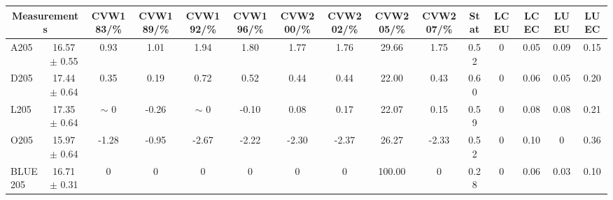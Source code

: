 \begin{table}[H]
\scriptsize
\begin{center}
\renewcommand{\arraystretch}{1.1}
\begin{tabular}{|lc|c|c|c|c|c|c|c|c|ccccc|}
\hline
\multicolumn{2}{|c|}{Measurements} & CVW{\tiny 183}/\%  & CVW{\tiny 189}/\%  & CVW{\tiny 192}/\%  & CVW{\tiny 196}/\%  & CVW{\tiny 200}/\%  & CVW{\tiny 202}/\%  & CVW{\tiny 205}/\%  & CVW{\tiny 207}/\%  & {\tiny Stat} & {\tiny LCEU} & {\tiny LCEC} & {\tiny LUEU} & {\tiny LUEC}\\
\hline
A205 &      16.57 $\pm$       0.55 &       0.93 &       1.01 &       1.94 &       1.80 &       1.77 &       1.76 &      29.66 &       1.75 &       0.52 &  0 &       0.05 &       0.09 &       0.15\\
D205 &      17.44 $\pm$       0.64 &       0.35 &       0.19 &       0.72 &       0.52 &       0.44 &       0.44 &      22.00 &       0.43 &       0.60 &  0 &       0.06 &       0.05 &       0.20\\
L205 &      17.35 $\pm$       0.64 &  {\tiny $\sim$ }0 &      -0.26 &  {\tiny $\sim$ }0 &      -0.10 &       0.08 &       0.17 &      22.07 &       0.15 &       0.59 &  0 &       0.08 &       0.08 &       0.21\\
O205 &      15.97 $\pm$       0.64 &      -1.28 &      -0.95 &      -2.67 &      -2.22 &      -2.30 &      -2.37 &      26.27 &      -2.33 &       0.52 &  0 &       0.10 &  0 &       0.36\\
\hline
BLUE {\tiny 205} &      16.71 $\pm$       0.31 &  0 &  0 &  0 &  0 &  0 &  0 &     100.00 &  0 &       0.28 &  0 &       0.06 &       0.03 &       0.10\\
\hline
\end{tabular}
\renewcommand{\arraystretch}{1}
\end{center}
\end{table}
\vspace*{-0.5cm}
